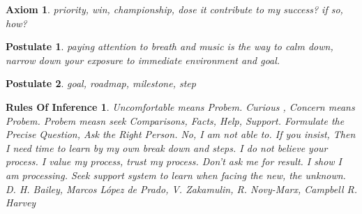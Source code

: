 \documentclass{article}
\newtheorem{axiom}{Axiom}
\newtheorem{postulate}{Postulate}
\newtheorem{rules of inference}{Rules Of Inference}
\begin{document}
\begin{axiom}
    priority,
    win, championship,
    dose it contribute to my success? if so, how?
\end{axiom}

\begin{postulate}
    paying attention to breath and music is the way to calm down,
    narrow down your exposure  to immediate environment and goal.
\end{postulate}

\begin{postulate}
    goal,
    roadmap,
    milestone,
    step
\end{postulate}

\begin{rules of inference}
    Uncomfortable means Probem.
    Curious , Concern means Probem.
    Probem measn seek Comparisons, Facts, Help, Support.
    Formulate the Precise Question, Ask the Right Person.
    No, I am not able to. If you insist,
    Then I need time to learn by my own break down and steps.
    I do not believe your process.
    I value my process, trust my process.
    Don't ask me for result. I show I am  processing.
    Seek support system to learn when facing the new, the unknown.
    D. H. Bailey, Marcos López de Prado, V. Zakamulin, R. Novy-Marx, Campbell R. Harvey
\end{rules of inference}
\end{document}
